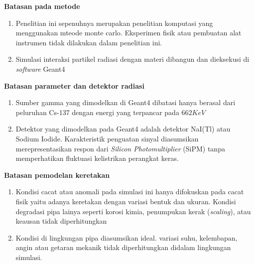 \documentclass[12pt,a4paper]{report}
\begin{document}
\textbf{Batasan pada metode}

\begin{enumerate}
    \item Penelitian ini sepenuhnya merupakan penelitian komputasi yang menggunakan mteode monte carlo. Eksperimen fisik atau pembuatan alat instrumen tidak dilakukan dalam penelitian ini.
    \item Simulasi interaksi partikel radiasi dengan materi dibangun dan dieksekusi di \textit{software} Geant4
\end{enumerate}

\textbf{Batasan parameter dan detektor radiasi}

\begin{enumerate}
    \item Sumber gamma yang dimodelkan di Geant4 dibatasi hanya berasal dari peluruhan Cs-137 dengan energi yang terpancar pada $662 KeV$
    \item Detektor yang dimodelkan pada Geant4 adalah detektor NaI(Tl) atau Sodium Iodide. Karakteristik penguatan sinyal diasumsikan merepresentasikan
    respon dari \textit{Silicon Photomultiplier} (SiPM) tanpa memperhatikan fluktuasi kelistrikan perangkat keras.
\end{enumerate}

\textbf{Batasan pemodelan keretakan}

\begin{enumerate}
    \item Kondisi cacat atau anomali pada simulasi ini hanya difokuskan pada cacat fisik yaitu adanya keretakan  dengan variasi bentuk dan ukuran. Kondisi degradasi pipa lainya seperti korosi kimia, 
    penumpukan kerak (\textit{scaling}), atau keausan tidak diperhitungkan
    \item Kondisi di lingkungan pipa diasumsikan ideal. variasi suhu, kelembapan, angin atau getaran mekanik tidak diperhitungkan didalam lingkungan simulasi.
\end{enumerate}
\end{document}
